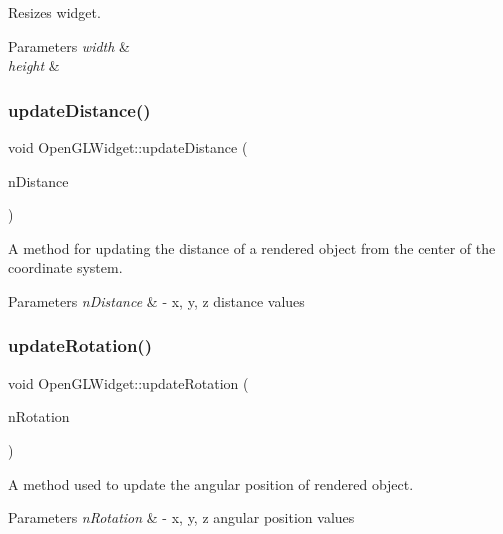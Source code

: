Resizes widget. 


\begin{DoxyParams}{Parameters}
{\em width} & \\
\hline
{\em height} & \\
\hline
\end{DoxyParams}
\mbox{\label{class_open_g_l_widget_a2170acd0e1f140dbf1771af9bf063c34}} 
\subsubsection{update\+Distance()}
{\footnotesize\ttfamily void Open\+G\+L\+Widget\+::update\+Distance (\begin{DoxyParamCaption}\item[{const Q\+Vector$<$ double $>$}]{n\+Distance }\end{DoxyParamCaption})}



A method for updating the distance of a rendered object from the center of the coordinate system. 


\begin{DoxyParams}{Parameters}
{\em n\+Distance} & -\/ x, y, z distance values \\
\hline
\end{DoxyParams}
\mbox{\label{class_open_g_l_widget_a7082dfc8237267697116a5fc03bd9a1e}} 
\subsubsection{update\+Rotation()}
{\footnotesize\ttfamily void Open\+G\+L\+Widget\+::update\+Rotation (\begin{DoxyParamCaption}\item[{const Q\+Vector$<$ double $>$}]{n\+Rotation }\end{DoxyParamCaption})}



A method used to update the angular position of rendered object. 


\begin{DoxyParams}{Parameters}
{\em n\+Rotation} & -\/ x, y, z angular position values \\
\hline
\end{DoxyParams}


